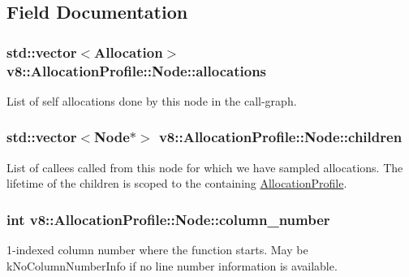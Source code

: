 \subsection{Field Documentation}
\subsubsection[{\texorpdfstring{allocations}{allocations}}]{\setlength{\rightskip}{0pt plus 5cm}std\+::vector$<${\bf Allocation}$>$ v8\+::\+Allocation\+Profile\+::\+Node\+::allocations}\hypertarget{structv8_1_1AllocationProfile_1_1Node_a6ee0934b35ba77fb5d8b53f02d5a3068}{}\label{structv8_1_1AllocationProfile_1_1Node_a6ee0934b35ba77fb5d8b53f02d5a3068}
List of self allocations done by this node in the call-\/graph. 
\subsubsection[{\texorpdfstring{children}{children}}]{\setlength{\rightskip}{0pt plus 5cm}std\+::vector$<${\bf Node}$\ast$$>$ v8\+::\+Allocation\+Profile\+::\+Node\+::children}\hypertarget{structv8_1_1AllocationProfile_1_1Node_a176673c0440cb1baaf7713e14da84db0}{}\label{structv8_1_1AllocationProfile_1_1Node_a176673c0440cb1baaf7713e14da84db0}
List of callees called from this node for which we have sampled allocations. The lifetime of the children is scoped to the containing \hyperlink{classv8_1_1AllocationProfile}{Allocation\+Profile}. 
\subsubsection[{\texorpdfstring{column\+\_\+number}{column_number}}]{\setlength{\rightskip}{0pt plus 5cm}int v8\+::\+Allocation\+Profile\+::\+Node\+::column\+\_\+number}\hypertarget{structv8_1_1AllocationProfile_1_1Node_a7cf86acc298428c858673fc1f9dbe305}{}\label{structv8_1_1AllocationProfile_1_1Node_a7cf86acc298428c858673fc1f9dbe305}
1-\/indexed column number where the function starts. May be k\+No\+Column\+Number\+Info if no line number information is available. 
